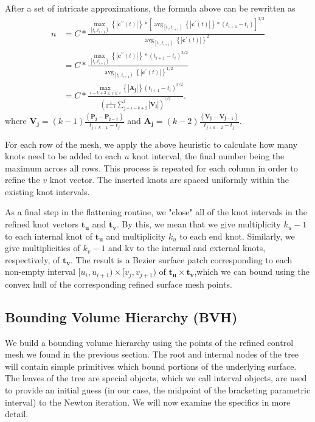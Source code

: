 \documentclass[acmtog]{acmart}
\begin{document}
After a set of intricate approximations, the formula above can be rewritten as
\[
    \begin{aligned}
        n & =C * \frac{\max _{\left[t_i, t_{i+1}\right)}\left\{\left|\mathbf{c}^{\prime \prime}(t)\right|\right\} *\left[\operatorname{avg}_{\left[t_i, t_{i+1}\right)}\left\{\left|\mathbf{c}^{\prime}(t)\right|\right\} *\left(t_{i+1}-t_i\right)\right]^{3 / 2}}{\operatorname{avg}_{\left[t_i, t_{i+1}\right)}\left\{\left|\mathbf{c}^{\prime}(t)\right|\right\}^2} \\
        & =C * \frac{\max_{\left[t_i, t_{i+1}\right)}\left\{\left|\mathbf{c}^{\prime \prime}(t)\right|\right\} *\left(t_{i+1}-t_i\right)^{3 / 2}}{\operatorname{avg}_{\left[t_i, t_{i+1}\right)}\left\{\left|\mathbf{c}^{\prime}(t)\right|\right\}^{1 / 2}} \\
        & =C * \frac{\max _{i-k+3 \leq j \leq i}\left\{\left|\mathbf{A}_{\mathbf{j}}\right|\right\}\left(t_{i+1}-t_i\right)^{3 / 2}}{\left(\frac{1}{k-1} \sum_{j=i-k+2}^i\left|\mathbf{V}_{\mathbf{j}}\right|\right)^{1 / 2}} .
        \end{aligned}
\]
where $\mathbf{V}_{\mathbf{j}}=(k-1) \frac{\left(\mathbf{P}_{\mathbf{j}}-\mathbf{P}_{\mathbf{j}-\mathbf{1}}\right)}{t_{j+k-1}-t_j}$ and $\mathbf{A}_{\mathbf{j}}=(k-2) \frac{\left(\mathbf{V}_{\mathbf{j}}-\mathbf{V}_{\mathbf{j}-1}\right)}{t_{j+k-2}-t_j}$.

For each row of the mesh, we apply the above heuristic to calculate how many knots need to be added to each $u$ knot interval, the final number being the maximum across all rows. This process is repeated for each column in order to refine the $v$ knot vector. The inserted knots are spaced uniformly within the existing knot intervals.

As a final step in the flattening routine, we "close" all of the knot intervals in the refined knot vectors $\mathbf{t}_{\mathbf{u}}$ and $\mathbf{t}_{\mathbf{v}}$. By this, we mean that we give multiplicity $k_u-1$ to each internal knot of $\mathbf{t}_{\mathbf{u}}$ and multiplicity $k_u$ to each end knot. Similarly, we give multiplicities of $k_v-1$ and kv to the internal and external knots, respectively, of $\mathbf{t}_{\mathbf{v}}$. The result is a Bezier surface patch corresponding to each non-empty interval $[u_i,u_{i+1})\times[v_j,v_{j+1})$ of $\mathbf{t}_{\mathbf{u}}\times\mathbf{t}_{\mathbf{v}}$,which we can bound using the convex hull of the corresponding refined surface mesh points.

\subsection{Bounding Volume Hierarchy (BVH)}
\hspace*{8pt}
We build a bounding volume hierarchy using the points of the refined control mesh we found in the previous section. The root and internal nodes of the tree will contain simple primitives which bound portions of the underlying surface. The leaves of the tree are special objects, which we call interval objects, are used to provide an initial guess (in our case, the midpoint of the bracketing parametric interval) to the Newton iteration. We will now examine the specifics in more detail.
\end{document}
